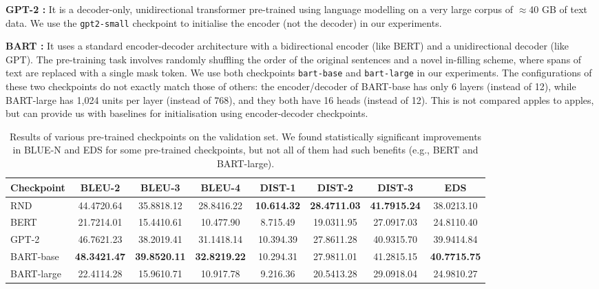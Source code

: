 \documentclass[letterpaper]{article} %
\begin{document}
\noindent
\textbf{GPT-2 \cite{radford2019language}:} It is a decoder-only, unidirectional transformer pre-trained using language modelling on a very large corpus of $\approx$40 GB of text data. We use the \texttt{gpt2-small} checkpoint to initialise the encoder (not the decoder) in our experiments.

\noindent
\textbf{BART \cite{DBLP:conf/acl/LewisLGGMLSZ20}:} It uses a standard encoder-decoder architecture with a bidirectional encoder (like BERT) and a unidirectional decoder (like GPT). The pre-training task involves randomly shuffling the order of the original sentences and a novel in-filling scheme, where spans of text are replaced with a single mask token. We use both checkpoints \texttt{bart-base} and \texttt{bart-large} in our experiments. The configurations of these two checkpoints do not exactly match those of others: the encoder/decoder of BART-base has only 6 layers (instead of 12), while BART-large has 1,024 units per layer (instead of 768), and they both have 16 heads (instead of 12). This is not compared apples to apples, but can provide us with baselines for initialisation using encoder-decoder checkpoints.

\begin{table}[t]
\begin{center}
\caption{Results of various pre-trained checkpoints on the validation set. We found statistically significant improvements in BLUE-N and EDS for some pre-trained checkpoints, but not all of them had such benefits (e.g., BERT and BART-large).}
\begin{tabular}{l|c|c|c|c|c|c|c}
\toprule %
Checkpoint & BLEU-2 & BLEU-3 & BLEU-4 & DIST-1 & DIST-2 & DIST-3 & EDS\\
\midrule %
RND & 44.4720.64 & 35.8818.12 & 28.8416.22 & \textbf{10.614.32} & \textbf{28.4711.03} & \textbf{41.7915.24} & 38.0213.10\\
BERT & 21.7214.01 & 15.4410.61 & 10.477.90 & 8.715.49 & 19.0311.95 & 27.0917.03 & 24.8110.40\\
GPT-2 & 46.7621.23 & 38.2019.41 & 31.1418.14 & 10.394.39 & 27.8611.28 & 40.9315.70 & 39.9414.84\\
BART-base & \textbf{48.3421.47} & \textbf{39.8520.11} & \textbf{32.8219.22} & 10.294.31 & 27.9811.01 & 41.2815.15 & \textbf{40.7715.75}\\
BART-large & 22.4114.28 & 15.9610.71 & 10.917.78 & 9.216.36 & 20.5413.28 & 29.0918.04 & 24.9810.27\\
\bottomrule %
\end{tabular}
\end{center}
\end{table}
\end{document}
